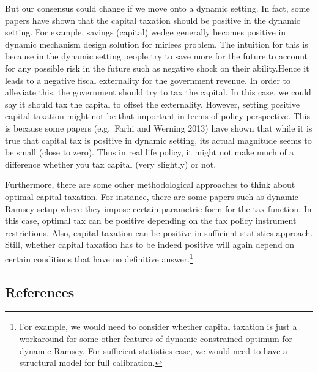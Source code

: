\documentclass[
  letterpaper,
  DIV=11,
  numbers=noendperiod]{scrartcl}
\begin{document}
But our consensus could change if we move onto a dynamic setting. In
fact, some papers have shown that the capital taxation should be
positive in the dynamic setting. For example, savings (capital) wedge
generally becomes positive in dynamic mechanism design solution for
mirlees problem. The intuition for this is because in the dynamic
setting people try to save more for the future to account for any
possible risk in the future such as negative shock on their
ability.Hence it leads to a negative fiscal externality for the
government revenue. In order to alleviate this, the government should
try to tax the capital. In this case, we could say it should tax the
capital to offset the externality. However, setting positive capital
taxation might not be that important in terms of policy perspective.
This is because some papers (e.g.~Farhi and Werning 2013) have shown
that while it is true that capital tax is positive in dynamic setting,
its actual magnitude seems to be small (close to zero). Thus in real
life policy, it might not make much of a difference whether you tax
capital (very slightly) or not.

Furthermore, there are some other methodological approaches to think
about optimal capital taxation. For instance, there are some papers such
as dynamic Ramsey setup where they impose certain parametric form for
the tax function. In this case, optimal tax can be positive depending on
the tax policy instrument restrictions. Also, capital taxation can be
positive in sufficient statistics approach. Still, whether capital
taxation has to be indeed positive will again depend on certain
conditions that have no definitive answer.\footnote{For example, we
  would need to consider whether capital taxation is just a workaround
  for some other features of dynamic constrained optimum for dynamic
  Ramsey. For sufficient statistics case, we would need to have a
  structural model for full calibration.}

\subsection*{References}\label{references}
\end{document}
